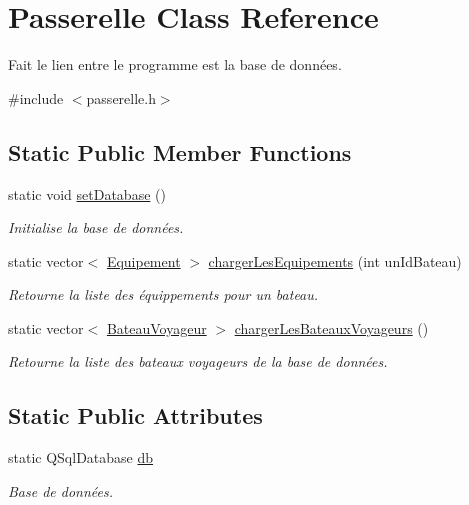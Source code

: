 \hypertarget{class_passerelle}{\section{Passerelle Class Reference}
\label{class_passerelle}
}


Fait le lien entre le programme est la base de données.  




{\ttfamily \#include $<$passerelle.\-h$>$}

\subsection*{Static Public Member Functions}
\begin{DoxyCompactItemize}
\item 
\hypertarget{class_passerelle_a3998dce0a06ca8cfe2ef3f4db05fce9c}{static void \hyperlink{class_passerelle_a3998dce0a06ca8cfe2ef3f4db05fce9c}{set\-Database} ()}\label{class_passerelle_a3998dce0a06ca8cfe2ef3f4db05fce9c}

\begin{DoxyCompactList}\small\item\em Initialise la base de données. \end{DoxyCompactList}\item 
static vector$<$ \hyperlink{class_equipement}{Equipement} $>$ \hyperlink{class_passerelle_af915f404b5bc365e3b64b14ec50d9a65}{charger\-Les\-Equipements} (int un\-Id\-Bateau)
\begin{DoxyCompactList}\small\item\em Retourne la liste des équippements pour un bateau. \end{DoxyCompactList}\item 
static vector$<$ \hyperlink{class_bateau_voyageur}{Bateau\-Voyageur} $>$ \hyperlink{class_passerelle_ab3785749561d6b2d334521490c15eb31}{charger\-Les\-Bateaux\-Voyageurs} ()
\begin{DoxyCompactList}\small\item\em Retourne la liste des bateaux voyageurs de la base de données. \end{DoxyCompactList}\end{DoxyCompactItemize}
\subsection*{Static Public Attributes}
\begin{DoxyCompactItemize}
\item 
\hypertarget{class_passerelle_ac7ec28a544613adf6422c1afdbf8f503}{static Q\-Sql\-Database \hyperlink{class_passerelle_ac7ec28a544613adf6422c1afdbf8f503}{db}}\label{class_passerelle_ac7ec28a544613adf6422c1afdbf8f503}

\begin{DoxyCompactList}\small\item\em Base de données. \end{DoxyCompactList}\end{DoxyCompactItemize}


